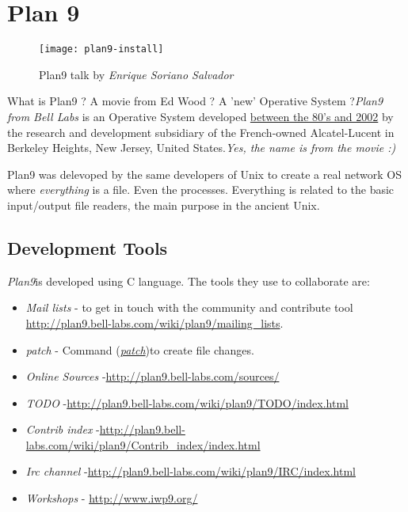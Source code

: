 \section{Plan 9}
\label{sec:plan9}

\begin{figure}[H]
\centering
\texttt{[image: plan9-install]}
\caption{Plan9 talk by \textit{Enrique Soriano Salvador}}
\label{plan9-film}
\end{figure}

\par What is Plan9 ? A movie from Ed Wood ? A 'new' Operative System ?\textit{Plan9 from Bell Labs} is an Operative System developed \href{http://swtch.com/plan9history/}{between the 80's and 2002} by the research and development subsidiary of the French-owned Alcatel-Lucent in Berkeley Heights, New Jersey, United States.\textit{Yes, the name is from the movie :)}

\par Plan9 was delevoped by the same developers of Unix to create a real network OS where \textit{everything} is a file. Even the processes. Everything is related to the basic input/output file readers, the main purpose in the ancient Unix.

\subsection{Development Tools}

\textit{Plan9}is developed using C language. The tools they use to collaborate are:
\begin{itemize}
	\item \textit{Mail lists} - to get in touch with the community and contribute tool \url{http://plan9.bell-labs.com/wiki/plan9/mailing_lists}.
	\item \textit{patch} - Command (\href{http://plan9.bell-labs.com/magic/man2html/1/patch}{\textit{patch}})to create file changes.
	\item \textit{Online Sources} -\url{http://plan9.bell-labs.com/sources/}
	\item \textit{TODO} -\url{http://plan9.bell-labs.com/wiki/plan9/TODO/index.html}
	\item \textit{Contrib index} -\url{http://plan9.bell-labs.com/wiki/plan9/Contrib_index/index.html}
	\item \textit{Irc channel} -\url{http://plan9.bell-labs.com/wiki/plan9/IRC/index.html}
	\item \textit{Workshops} - \url{http://www.iwp9.org/}
\end{itemize}

